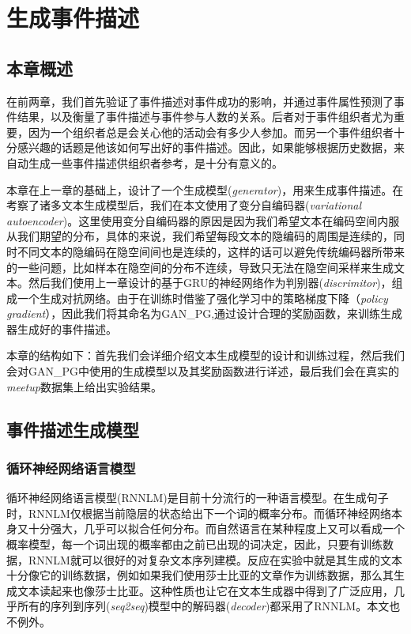 % 
\section{生成事件描述}

\subsection{本章概述}
在前两章，我们首先验证了事件描述对事件成功的影响，并通过事件属性预测了事件结果，以及衡量了事件描述与事件参与人数的关系。后者对于事件组织者尤为重要，因为一个组织者总是会关心他的活动会有多少人参加。而另一个事件组织者十分感兴趣的话题是他该如何写出好的事件描述。因此，如果能够根据历史数据，来自动生成一些事件描述供组织者参考，是十分有意义的。

本章在上一章的基础上，设计了一个生成模型(\textit{generator})，用来生成事件描述。在考察了诸多文本生成模型后，我们在本文使用了变分自编码器\cite{kingma_auto-encoding_2013,bowman_generating_2015}(\textit{variational autoencoder})。这里使用变分自编码器的原因是因为我们希望文本在编码空间内服从我们期望的分布，具体的来说，我们希望每段文本的隐编码的周围是连续的，同时不同文本的隐编码在隐空间间也是连续的，这样的话可以避免传统编码器所带来的一些问题，比如样本在隐空间的分布不连续，导致只无法在隐空间采样来生成文本。然后我们使用上一章设计的基于GRU的神经网络作为判别器(\textit{discrimitor})，组成一个生成对抗网络\cite{goodfellow_generative_2014}。由于在训练时借鉴了强化学习中的策略梯度下降（\textit{policy gradient}），因此我们将其命名为GAN\_PG,通过设计合理的奖励函数，来训练生成器生成好的事件描述。

本章的结构如下：首先我们会详细介绍文本生成模型的设计和训练过程，然后我们会对GAN\_PG中使用的生成模型以及其奖励函数进行详述，最后我们会在真实的\textit{meetup}数据集上给出实验结果。

\subsection{事件描述生成模型}
\subsubsection{循环神经网络语言模型}
循环神经网络语言模型(RNNLM\cite{mikolov_rnnlm_2011})是目前十分流行的一种语言模型。在生成句子时，RNNLM仅根据当前隐层的状态给出下一个词的概率分布。而循环神经网络本身又十分强大，几乎可以拟合任何分布。而自然语言在某种程度上又可以看成一个概率模型，每一个词出现的概率都由之前已出现的词决定，因此，只要有训练数据，RNNLM就可以很好的对复杂文本序列建模。反应在实验中就是其生成的文本十分像它的训练数据，例如如果我们使用莎士比亚的文章作为训练数据，那么其生成文本读起来也像莎士比亚。这种性质也让它在文本生成器中得到了广泛应用，几乎所有的序列到序列(\textit{seq2seq})模型中的解码器(\textit{decoder})都采用了RNNLM。本文也不例外。

